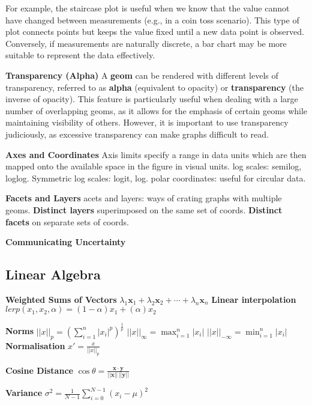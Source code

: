 \documentclass{article}
\begin{document}
\noindent For example, the staircase plot is useful when we know that the value cannot have changed between measurements (e.g., in a coin toss scenario).
This type of plot connects points but keeps the value fixed until a new data point is observed.
Conversely, if measurements are naturally discrete, a bar chart may be more suitable to represent the data effectively.

\noindent \textbf{Transparency (Alpha)}
\noindent A \textbf{geom} can be rendered with different levels of transparency,
referred to as \textbf{alpha} (equivalent to opacity) or
\textbf{transparency} (the inverse of opacity).
This feature is particularly useful when dealing with a large number
of overlapping geoms, as it allows for the emphasis of certain geoms
while maintaining visibility of others.
However, it is important to use transparency judiciously, as excessive
transparency can make graphs difficult to read.

\noindent \textbf{Axes and Coordinates}
Axis limits specify a range in data units which are then mapped onto the available space in the figure in visual units.
log scales: semilog, loglog. Symmetric log scales: logit, log.
polar coordinates: useful for circular data.

\noindent \textbf{Facets and Layers}
acets and layers: ways of crating graphs with multiple geoms.
\textbf{Distinct layers} superimposed on the same set of coords.
\textbf{Distinct facets} on separate sets of coords.

\noindent \textbf{Communicating Uncertainty}


\subsection*{Linear Algebra}


\noindent \textbf{Weighted Sums of Vectors}
$\lambda_1 \mathbf{x}_1 + \lambda_2 \mathbf{x}_2 + \cdots + \lambda_n \mathbf{x}_n$
\textbf{Linear interpolation}
$lerp(x_1, x_2, \alpha) = (1 - \alpha)x_1 + (\alpha)x_2$

\noindent \textbf{Norms}
$||x||_p = {(\sum_{i=1}^{n} |x_i|^p)}^{\frac{1}{p}}$
$||x||_\infty = \max_{i=1}^{n} |x_i|$
$||x||_{-\infty} = \min_{i=1}^{n} |x_i|$
\textbf{Normalisation} $x' = \frac{x}{||x||_p}$

\noindent \textbf{Cosine Distance}
$\cos \theta = \frac{\mathbf{x} \cdot \mathbf{y}}{||\mathbf{x}|| \, ||\mathbf{y}||}$

\noindent \textbf{Variance}
$\sigma^2 = \frac{1}{N - 1} \sum_{i=0}^{N-1} {(x_i - \mu)}^2$
\end{document}

